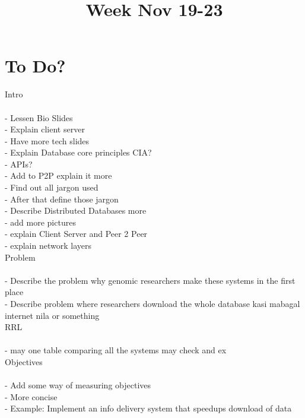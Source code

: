 \documentclass{article}
\begin{document}
\title{Week Nov 19-23}

\maketitle
\section{To Do?}

Intro \\ \\
- Lessen Bio Slides \\
- Explain client server \\ 
- Have more tech slides \\
- Explain Database core principles CIA? \\
- APIs? \\
- Add to P2P explain it more \\
- Find out all jargon used \\
- After that define those jargon \\
- Describe Distributed Databases more \\
- add more pictures \\
- explain Client Server and Peer 2 Peer \\
- explain network layers \\


Problem \\ \\
- Describe the problem why genomic researchers make these systems in the first place \\
- Describe problem where researchers download the whole database kasi mabagal internet nila or something \\


RRL \\ \\
- may one table comparing all the systems may check and ex \\


Objectives \\ \\
- Add some way of measuring objectives \\
- More concise \\
- Example: Implement an info delivery system that speedups download of data \\
\end{document}
